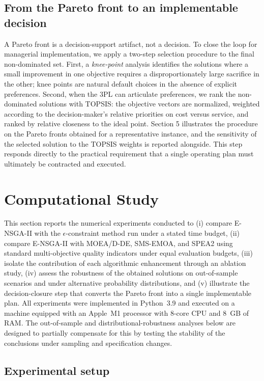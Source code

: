 \documentclass[11pt, a4paper]{article}
\begin{document}
\subsection{{From the Pareto front to an implementable decision}}
A Pareto front is a decision-support artifact, not a decision. To close
the loop for managerial implementation, we apply a two-step selection
procedure to the final non-dominated set. First, a \emph{knee-point}
analysis identifies the solutions where a small improvement in one
objective requires a disproportionately large sacrifice in the other;
knee points are natural default choices in the absence of explicit
preferences. Second, when the 3PL can articulate preferences, we rank
the non-dominated solutions with TOPSIS: the objective vectors are
normalized, weighted according to the decision-maker's relative
priorities on cost versus service, and ranked by relative closeness to
the ideal point. Section 5 illustrates the procedure on the Pareto
fronts obtained for a representative instance, and the sensitivity of
the selected solution to the TOPSIS weights is reported alongside. This
step responds directly to the practical requirement that a single
operating plan must ultimately be contracted and executed.
\section{Computational Study}\label{computational-study}
This section reports the numerical experiments conducted to (i) compare E-NSGA-II with the $\epsilon$-constraint method run under a stated time budget, (ii) compare E-NSGA-II with MOEA/D-DE, SMS-EMOA, and SPEA2 using standard multi-objective quality indicators under equal evaluation budgets, (iii) isolate the contribution of each algorithmic enhancement through
an ablation study, (iv) assess the robustness of the obtained solutions on out-of-sample scenarios and under alternative probability distributions, and (v) illustrate the decision-closure step that converts the Pareto front into a single implementable plan. All experiments were implemented in Python~3.9 and executed on a machine equipped with an Apple~M1 processor with 8-core CPU and 8~GB of RAM. The out-of-sample and distributional-robustness analyses below are designed to partially compensate for this by testing the stability of the conclusions under sampling and specification changes.
\subsection{Experimental setup}\label{experimental-setup}
\end{document}
